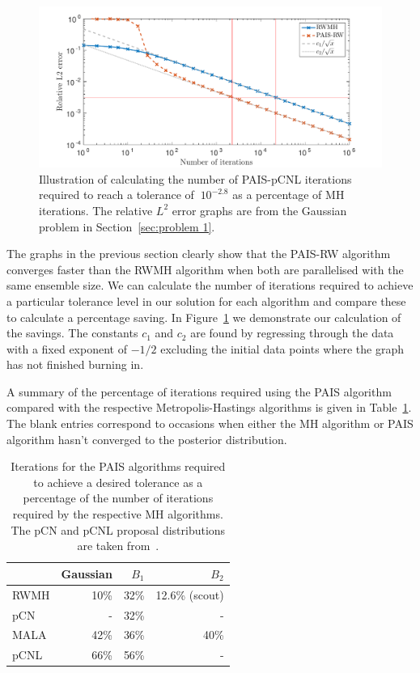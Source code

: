 \documentclass[final]{siamltex}
\begin{document}
\begin{figure}
\begin{center}
\includegraphics[width=\textwidth]{"figures/calc_saving"}
\caption{Illustration of calculating the number of PAIS-pCNL iterations required to reach a tolerance of $~10^{-2.8}$ as a percentage of MH iterations. The relative $L^2$ error graphs are from the Gaussian problem in Section~\ref{sec:problem 1}.}
\label{fig:calc_saving}
\end{center}
\end{figure}

The graphs in the previous section clearly show that the PAIS-RW algorithm converges faster than the RWMH algorithm when both are parallelised with the same ensemble size. We can calculate the number of iterations required to achieve a particular tolerance level in our solution for each algorithm and compare these to calculate a percentage saving. In Figure~\ref{fig:calc_saving} we demonstrate our calculation of the savings. The constants $c_1$ and $c_2$ are found by regressing through the data with a fixed exponent of $-1/2$ excluding the initial data points where the graph has not finished burning in.

A summary of the percentage of iterations required using the PAIS algorithm compared with the respective Metropolis-Hastings algorithms is given in Table~\ref{table:calc_savings}. The blank entries correspond to occasions when either the MH algorithm or PAIS algorithm hasn't converged to the posterior distribution.

\begin{table}[!h]
\centering
\begin{tabular}{|l|r|r|r|}
\hline
		& Gaussian & $B_1$ & $B_2$ \\ \hline
	RWMH & 10\% & 32\% & 12.6\% (scout) \\
	pCN & - & 32\% & - \\
	MALA & 42\% & 36\% & 40\% \\
	pCNL & 66\% & 56\% & - \\ \hline
\end{tabular}
\caption{Iterations for the PAIS algorithms required to achieve a desired tolerance as a percentage of the number of iterations required by the respective MH algorithms. The pCN and pCNL proposal distributions are taken from~\cite{cotter2013mcmc}.}
\label{table:calc_savings}
\end{table}
\end{document}
